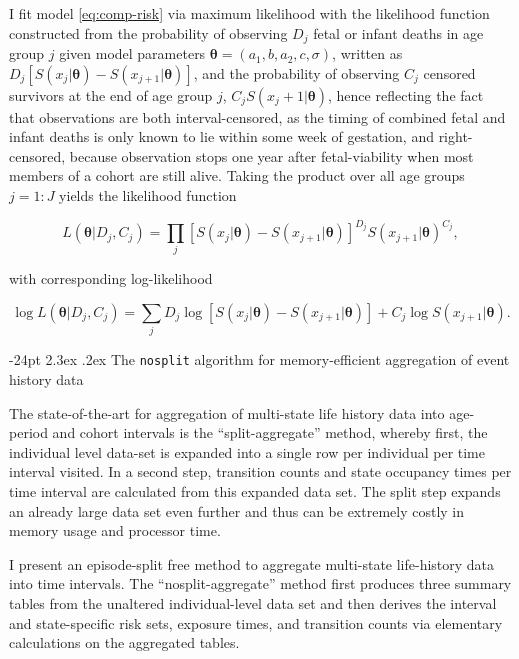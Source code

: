 \documentclass[10pt, twoside]{article}
\makeatletter
\renewcommand\section{\@startsection {section}{1}{\z@}%
                                   {-24pt}%
                                   {2.3ex \@plus.2ex}%
                                   {\normalfont\large\bfseries}}
\makeatother
\begin{document}
I fit model \eqref{eq:comp-risk} via maximum likelihood with the likelihood function constructed from the probability of observing \(D_j\) fetal or infant deaths in age group \(j\) given model parameters \(\boldsymbol\theta=(a_1, b, a_2, c, \sigma)\), written as \(D_j[S(x_j|\boldsymbol\theta) - S(x_{j+1}|\boldsymbol\theta)]\), and the probability of observing \(C_j\) censored survivors at the end of age group \(j\), \(C_jS(x_j+1|\boldsymbol\theta)\), hence reflecting the fact that observations are both interval-censored, as the timing of combined fetal and infant deaths is only known to lie within some week of gestation, and right-censored, because observation stops one year after fetal-viability when most members of a cohort are still alive. Taking the product over all age groups \(j=1:J\) yields the likelihood function

\[
L(\boldsymbol\theta|D_j, C_j) = \prod_{j} \left[S(x_j|\boldsymbol\theta) - S(x_{j+1}|\boldsymbol\theta)\right]^{D_j}S(x_{j+1}|\boldsymbol\theta)^{C_j},
\]

with corresponding log-likelihood

\[
\log L(\boldsymbol\theta|D_j, C_j) = \sum_j D_j\log\left[S(x_j|\boldsymbol\theta) - S(x_{j+1}|\boldsymbol\theta)\right] + C_j\log S(x_{j+1}|\boldsymbol\theta).
\]

\clearpage

\hypertarget{the-nosplit-algorithm-for-memory-efficient-aggregation-of-event-history-data}{%
\section{\texorpdfstring{The \texttt{nosplit} algorithm for memory-efficient aggregation of event history data}{The nosplit algorithm for memory-efficient aggregation of event history data}}\label{the-nosplit-algorithm-for-memory-efficient-aggregation-of-event-history-data}}

The state-of-the-art for aggregation of multi-state life history data into age-period and cohort intervals is the ``split-aggregate'' method, whereby first, the individual level data-set is expanded into a single row per individual per time interval visited. In a second step, transition counts and state occupancy times per time interval are calculated from this expanded data set. The split step expands an already large data set even further and thus can be extremely costly in memory usage and processor time.

I present an episode-split free method to aggregate multi-state life-history data into time intervals. The ``nosplit-aggregate'' method first produces three summary tables from the unaltered individual-level data set and then derives the interval and state-specific risk sets, exposure times, and transition counts via elementary calculations on the aggregated tables.
\end{document}
